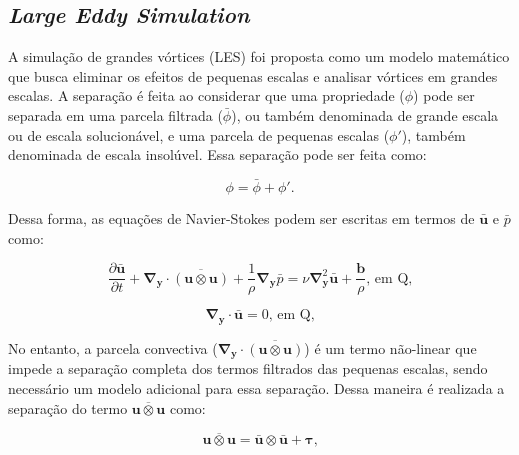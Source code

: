 \documentclass[_ArquivoPrincipal.tex]{subfiles}
\begin{document}
\subsection{\textit{Large Eddy Simulation}} \label{LES}

A simulação de grandes vórtices (LES) foi proposta como um modelo matemático que busca eliminar os efeitos de pequenas escalas e analisar vórtices em grandes escalas. A separação é feita ao considerar que uma propriedade ($\phi$) pode ser separada em uma parcela filtrada ($\bar{\phi}$), ou também denominada de grande escala ou de escala solucionável, e uma parcela de pequenas escalas ($\phi'$), também denominada de escala insolúvel. Essa separação pode ser feita como:

\begin{equation}
    \phi=\bar{\phi}+\phi'\text{.}
    \label{Sep}
\end{equation}

Dessa forma, as equações de Navier-Stokes podem ser escritas em termos de $\bar{\mathbf{u}}$ e $\bar{p}$ como:

\begin{equation}
    \frac{\partial\bar{\mathbf{u}}}{\partial t}+\mathbf{\nabla}_\mathbf{y}\cdot\overline{(\mathbf{u}\otimes\mathbf{u})}+\frac{1}{\rho}\mathbf{\nabla}_\mathbf{y}\bar{p}=\nu\mathbf{\nabla}^2_\mathbf{y}\bar{\mathbf{u}}+\frac{\mathbf{b}}{\rho}\text{, em }\mathrm{Q}\text{,}
    \label{SistFilt1}
\end{equation}

\begin{equation}
    \mathbf{\nabla}_\mathbf{y}\cdot\bar{\mathbf{u}}=0\text{, em }\mathrm{Q}\text{,}
    \label{SistFilt2}
\end{equation}

No entanto, a parcela convectiva ($\mathbf{\nabla}_\mathbf{y}\cdot\overline{(\mathbf{u}\otimes\mathbf{u})}$) é um termo não-linear que impede a separação completa dos termos filtrados das pequenas escalas, sendo necessário um modelo adicional para essa separação. Dessa maneira é realizada a separação do termo $\overline{\mathbf{u}\otimes\mathbf{u}}$ como:

\begin{equation}
    \overline{\mathbf{u}\otimes\mathbf{u}}=\bar{\mathbf{u}}\otimes\bar{\mathbf{u}}+\mathbf{\tau}\text{,}
    \label{Sep2}
\end{equation}
\end{document}
